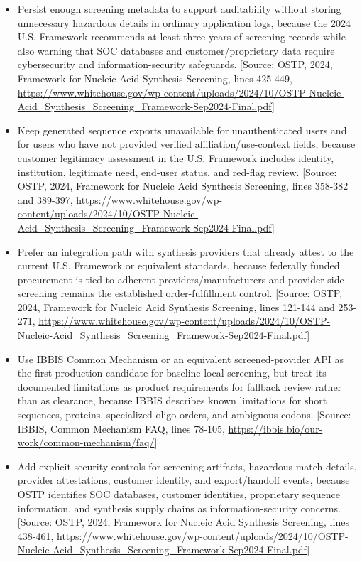 \documentclass[11pt]{report}
\begin{document}
\begin{itemize}
\item Persist enough screening metadata to support auditability without storing unnecessary hazardous details in ordinary application logs, because the 2024 U.S. Framework recommends at least three years of screening records while also warning that SOC databases and customer/proprietary data require cybersecurity and information-security safeguards. [Source: OSTP, 2024, Framework for Nucleic Acid Synthesis Screening, lines 425-449, \url{https://www.whitehouse.gov/wp-content/uploads/2024/10/OSTP-Nucleic-Acid_Synthesis_Screening_Framework-Sep2024-Final.pdf}]
\item Keep generated sequence exports unavailable for unauthenticated users and for users who have not provided verified affiliation/use-context fields, because customer legitimacy assessment in the U.S. Framework includes identity, institution, legitimate need, end-user status, and red-flag review. [Source: OSTP, 2024, Framework for Nucleic Acid Synthesis Screening, lines 358-382 and 389-397, \url{https://www.whitehouse.gov/wp-content/uploads/2024/10/OSTP-Nucleic-Acid_Synthesis_Screening_Framework-Sep2024-Final.pdf}]
\item Prefer an integration path with synthesis providers that already attest to the current U.S. Framework or equivalent standards, because federally funded procurement is tied to adherent providers/manufacturers and provider-side screening remains the established order-fulfillment control. [Source: OSTP, 2024, Framework for Nucleic Acid Synthesis Screening, lines 121-144 and 253-271, \url{https://www.whitehouse.gov/wp-content/uploads/2024/10/OSTP-Nucleic-Acid_Synthesis_Screening_Framework-Sep2024-Final.pdf}]
\item Use IBBIS Common Mechanism or an equivalent screened-provider API as the first production candidate for baseline local screening, but treat its documented limitations as product requirements for fallback review rather than as clearance, because IBBIS describes known limitations for short sequences, proteins, specialized oligo orders, and ambiguous codons. [Source: IBBIS, Common Mechanism FAQ, lines 78-105, \url{https://ibbis.bio/our-work/common-mechanism/faq/}]
\item Add explicit security controls for screening artifacts, hazardous-match details, provider attestations, customer identity, and export/handoff events, because OSTP identifies SOC databases, customer identities, proprietary sequence information, and synthesis supply chains as information-security concerns. [Source: OSTP, 2024, Framework for Nucleic Acid Synthesis Screening, lines 438-461, \url{https://www.whitehouse.gov/wp-content/uploads/2024/10/OSTP-Nucleic-Acid_Synthesis_Screening_Framework-Sep2024-Final.pdf}]

\end{itemize}
\end{document}
